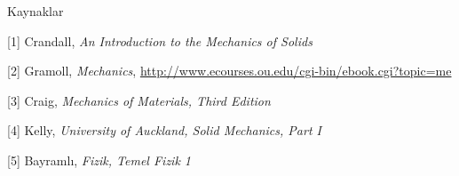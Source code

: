 \documentclass[12pt,fleqn]{article}\usepackage{../../common}
\begin{document}
Kaynaklar

[1] Crandall, {\em An Introduction to the Mechanics of Solids}

[2] Gramoll, {\em Mechanics},
    \url{http://www.ecourses.ou.edu/cgi-bin/ebook.cgi?topic=me}

[3] Craig, {\em Mechanics of Materials, Third Edition}

[4] Kelly, {\em University of Auckland, Solid Mechanics, Part I}

[5] Bayramlı, {\em Fizik, Temel Fizik 1}
    
\end{document}
